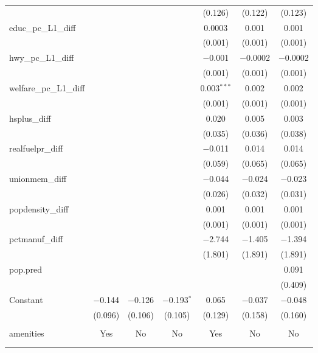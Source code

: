 \begin{table}[!htbp]
\begin{tabular}{@{\extracolsep{5pt}}lcccccc}
  &  &  &  & (0.126) & (0.122) & (0.123) \\ 
  educ\_pc\_L1\_diff &  &  &  & 0.0003 & 0.001 & 0.001 \\ 
  &  &  &  & (0.001) & (0.001) & (0.001) \\ 
  hwy\_pc\_L1\_diff &  &  &  & $-$0.001 & $-$0.0002 & $-$0.0002 \\ 
  &  &  &  & (0.001) & (0.001) & (0.001) \\ 
  welfare\_pc\_L1\_diff &  &  &  & 0.003$^{***}$ & 0.002 & 0.002 \\ 
  &  &  &  & (0.001) & (0.001) & (0.001) \\ 
  hsplus\_diff &  &  &  & 0.020 & 0.005 & 0.003 \\ 
  &  &  &  & (0.035) & (0.036) & (0.038) \\ 
  realfuelpr\_diff &  &  &  & $-$0.011 & 0.014 & 0.014 \\ 
  &  &  &  & (0.059) & (0.065) & (0.065) \\ 
  unionmem\_diff &  &  &  & $-$0.044 & $-$0.024 & $-$0.023 \\ 
  &  &  &  & (0.026) & (0.032) & (0.031) \\ 
  popdensity\_diff &  &  &  & 0.001 & 0.001 & 0.001 \\ 
  &  &  &  & (0.001) & (0.001) & (0.001) \\ 
  pctmanuf\_diff &  &  &  & $-$2.744 & $-$1.405 & $-$1.394 \\ 
  &  &  &  & (1.801) & (1.891) & (1.891) \\ 
  pop.pred &  &  &  &  &  & 0.091 \\ 
  &  &  &  &  &  & (0.409) \\ 
  Constant & $-$0.144 & $-$0.126 & $-$0.193$^{*}$ & 0.065 & $-$0.037 & $-$0.048 \\ 
  & (0.096) & (0.106) & (0.105) & (0.129) & (0.158) & (0.160) \\ 
 \hline \\[-1.8ex] 
amenities & Yes & No & No & Yes & No & No \\ 
\hline \\[-1.8ex] 
\hline 
\hline \\[-1.8ex] 
\end{tabular} 
\end{table} 
